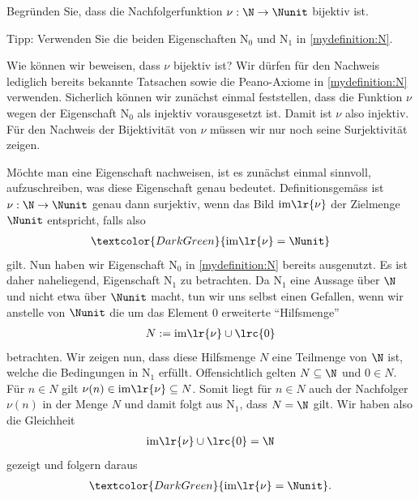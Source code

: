 \begin{mychallenge}\label{mychallenge:0107}
	Begründen Sie, dass die Nachfolgerfunktion $\nu:\N\to\Nunit$ bijektiv ist.

	\noindent
	Tipp: Verwenden Sie die beiden Eigenschaften N$_0$ und N$_1$ in \cref{mydefinition:N}.
	\begin{myanswer}
		Wie können wir beweisen, dass $\nu$ bijektiv ist?
		Wir dürfen für den Nachweis lediglich bereits bekannte Tatsachen sowie die Peano-Axiome in \cref{mydefinition:N} verwenden.
		Sicherlich können wir zunächst einmal feststellen, dass die Funktion $\nu$ wegen der Eigenschaft N$_0$ als injektiv vorausgesetzt ist.
		Damit ist $\nu$ also injektiv. Für den Nachweis der Bijektivität von $\nu$ müssen wir nur noch seine Surjektivität zeigen.

		Möchte man eine Eigenschaft nachweisen, ist es zunächst einmal sinnvoll, aufzuschreiben, was diese Eigenschaft genau bedeutet.
		Definitionsgemäss ist $\nu:\N\to\Nunit$ genau dann surjektiv, wenn das Bild $\text{im}\lr{\nu}$ der Zielmenge $\Nunit$ entspricht, falls also
		\begin{align*}
			\textcolor{DarkGreen}{\text{im}\lr{\nu} = \Nunit}
		\end{align*}
		gilt.
		Nun haben wir Eigenschaft N$_0$ in \cref{mydefinition:N} bereits ausgenutzt.
		Es ist daher naheliegend, Eigenschaft N$_1$ zu betrachten.
		Da N$_1$ eine Aussage über $\N$ und nicht etwa über $\Nunit$ macht,
		tun wir uns selbst einen Gefallen, wenn wir anstelle von $\Nunit$ die um das Element $0$ erweiterte \enquote{Hilfsmenge}
		\begin{align*}
			N := \text{im}\lr{\nu} \cup \lrc{0}
		\end{align*}
		betrachten.
		Wir zeigen nun, dass diese Hilfsmenge $N$ eine Teilmenge von $\N$ ist, welche die Bedingungen in N$_1$ erfüllt.
		Offensichtlich gelten $N\subseteq \N$ und $0\in N$.
		Für $n\in N$ gilt $\nu(n)\in\text{im}\lr{\nu}\subseteq N$.
		Somit liegt für $n\in N$ auch der Nachfolger $\nu(n)$ in der Menge $N$ und damit folgt aus N$_1$, dass $N = \N$ gilt.
		Wir haben also die Gleichheit
		\begin{align*}
			\text{im}\lr{\nu} \cup \lrc{0} = \N
		\end{align*}
		gezeigt und folgern daraus
		\begin{align*}
			\textcolor{DarkGreen}{\text{im}\lr{\nu} = \Nunit}.
		\end{align*}
	\end{myanswer}
\end{mychallenge}

